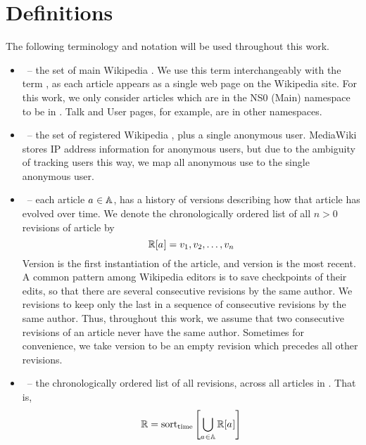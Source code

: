 
\chapter{Definitions}
\label{ch:defs}

The following terminology and notation
will be used throughout this work.

\renewcommand{\labelitemi}{}
\begin{itemize}
\item \articles \ -- the set of main Wikipedia .
    We use this term interchangeably with the term ,
    as each article appears as a single web page on the Wikipedia site.
    For this work, we only consider articles which are in
    the NS0 (Main) namespace to be in \articles.
    Talk and User pages, for example, are in other namespaces.
\item \users \ -- the set of registered Wikipedia ,
    plus a single anonymous user.
    MediaWiki stores IP address information for anonymous users,
    but due to the ambiguity of tracking users this way,
    we map all anonymous use to the single anonymous user.
\item \revisions{\article{}} \ -- each article $a_{} \in \mathbb{A}$,
    has a history of versions
    describing how that article has evolved over time.
    We denote the chronologically ordered list
    of all $n > 0$ revisions of article \article{} by
    \begin{equation}
	\revisions{\article{}} =
		\version{1}, \version{2}, \ldots, \version{n}
    \end{equation}
    Version  is the first instantiation of the article,
    and version  is the most recent.
    A common pattern among Wikipedia editors is to save checkpoints
    of their edits, so that there are several consecutive revisions by
    the same author.
    We  revisions to keep only the last in a sequence of
    consecutive revisions by the same author.
    Thus, throughout this work, we assume that two consecutive revisions
    of an article never have the same author.
    Sometimes for convenience, we take version  to be
    an empty revision which precedes all other revisions.
\item \revisions{} \ -- the chronologically ordered list of all
    revisions, across all articles in \articles.
    That is,
    \begin{equation}
    \revisions{} = \mathrm{sort}_\mathrm{time}\left[
	\bigcup_{\article{} \in \articles} \revisions{\article{}}
	\right]
    \end{equation}


\end{itemize}
